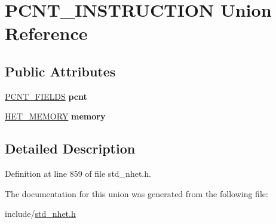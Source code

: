 \hypertarget{unionPCNT__INSTRUCTION}{}\section{P\+C\+N\+T\+\_\+\+I\+N\+S\+T\+R\+U\+C\+T\+I\+ON Union Reference}
\label{unionPCNT__INSTRUCTION}
\subsection*{Public Attributes}
\begin{DoxyCompactItemize}
\item 
\mbox{\label{unionPCNT__INSTRUCTION_a49a9dba4bca3d6d04c5569963fa1f561}} 
\mbox{\hyperlink{structpcnt__format}{P\+C\+N\+T\+\_\+\+F\+I\+E\+L\+DS}} {\bfseries pcnt}
\item 
\mbox{\label{unionPCNT__INSTRUCTION_abbfb0e4589f70d019f4b9e1c1fff03ad}} 
\mbox{\hyperlink{structmemory__format}{H\+E\+T\+\_\+\+M\+E\+M\+O\+RY}} {\bfseries memory}
\end{DoxyCompactItemize}


\subsection{Detailed Description}


Definition at line 859 of file std\+\_\+nhet.\+h.



The documentation for this union was generated from the following file\+:\begin{DoxyCompactItemize}
\item 
include/\mbox{\hyperlink{std__nhet_8h}{std\+\_\+nhet.\+h}}\end{DoxyCompactItemize}

